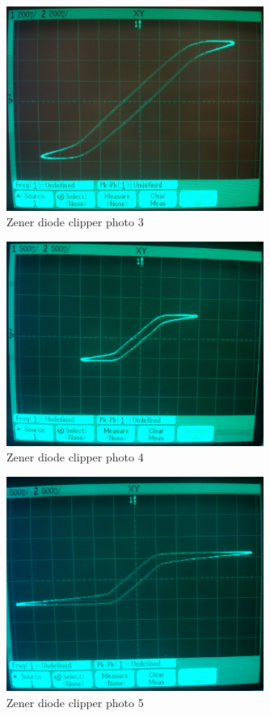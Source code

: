 \documentclass[11pt,a4paper]{article}
\begin{document}
\begin{figure}[htbp]
    \centering
    \includegraphics[width=0.75\textwidth]{img/clip_xy_3.jpg}
    \caption{Zener diode clipper photo 3}
    \label{fig:clip_xy_3}
\end{figure}

\begin{figure}[htbp]
    \centering
    \includegraphics[width=0.75\textwidth]{img/clip_xy_4.jpg}
    \caption{Zener diode clipper photo 4}
    \label{fig:clip_xy_4}
\end{figure}

\begin{figure}[htbp]
    \centering
    \includegraphics[width=0.75\textwidth]{img/clip_xy_5.jpg}
    \caption{Zener diode clipper photo 5}
    \label{fig:clip_xy_5}
\end{figure}
\end{document}
